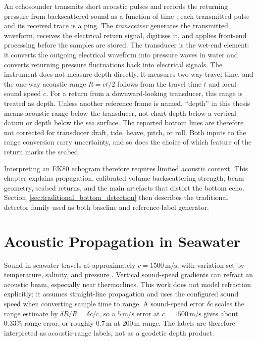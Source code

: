 
An echosounder transmits short acoustic pulses and records the returning pressure from backscattered sound as a function of time \cite{demer_calibration_2015}; each transmitted pulse and its received trace is a ping. The \emph{transceiver} generates the transmitted waveform, receives the electrical return signal, digitises it, and applies front-end processing before the samples are stored. The transducer is the wet-end element: it converts the outgoing electrical waveform into pressure waves in water and converts returning pressure fluctuations back into electrical signals. The instrument does not measure depth directly. It measures two-way travel time, and the one-way acoustic range $R = ct/2$ follows from the travel time $t$ and local sound speed $c$. For a return from a downward-looking transducer, this range is treated as depth. Unless another reference frame is named, ``depth'' in this thesis means acoustic range below the transducer, not chart depth below a vertical datum or depth below the sea surface. The reported bottom lines are therefore not corrected for transducer draft, tide, heave, pitch, or roll. Both inputs to the range conversion carry uncertainty, and so does the choice of which feature of the return marks the seabed.

Interpreting an EK80 echogram therefore requires limited acoustic context. This chapter explains propagation, calibrated volume backscattering strength, beam geometry, seabed returns, and the main artefacts that distort the bottom echo. Section~\ref{sec:traditional_bottom_detection} then describes the traditional detector family used as both baseline and reference-label generator.

\section{Acoustic Propagation in Seawater}
\label{sec:propagation}

Sound in seawater travels at approximately $c = 1500\,\text{m/s}$, with variation set by temperature, salinity, and pressure \cite{mackenzie_nineterm_1981,npl_sound_speed_seawater}. Vertical sound-speed gradients can refract an acoustic beam, especially near thermoclines. This work does not model refraction explicitly; it assumes straight-line propagation and uses the configured sound speed when converting sample time to range. A sound-speed error $\delta c$ scales the range estimate by $\delta R/R=\delta c/c$, so a $5\,\text{m/s}$ error at $c=1500\,\text{m/s}$ gives about $0.33\%$ range error, or roughly $0.7\,\text{m}$ at $200\,\text{m}$ range. The labels are therefore interpreted as acoustic-range labels, not as a geodetic depth product.

